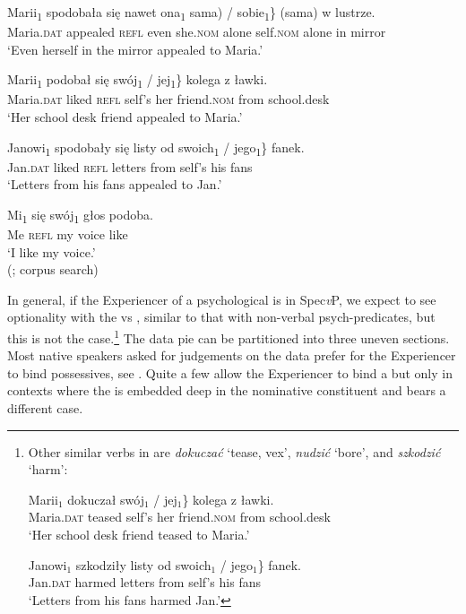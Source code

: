 \documentclass[output=paper,nonflat,colorlinks,citecolor=brown,newtxmath]{langsci/langscibook}
\begin{document}
\ea \label{ex:witkos:43}
\gll Marii\textsubscript{1} spodobała się nawet  ona\textsubscript{1} \minsp{\{(} sama) / \minsp{*} sobie\textsubscript{1}\} (sama) w lustrze.\\
     Maria.\textsc{dat} appealed \textsc{refl} even {} she.\textsc{nom} {} alone {} {} self.\textsc{nom} alone in mirror\\
\glt `Even herself in the mirror appealed to Maria.'
\z

\ea \label{ex:witkos:44}
\gll Marii\textsubscript{1} podobał się \minsp{\{*} swój\textsubscript{1} / jej\textsubscript{1}\} kolega z ławki.\\
     Maria.\textsc{dat} liked \textsc{refl} {} self’s {} her friend.\textsc{nom} from school.desk\\
\glt `Her school desk friend appealed to Maria.'
\z

\ea \label{ex:witkos:45}
\gll Janowi\textsubscript{1} spodobały się listy od \minsp{\{} swoich\textsubscript{1} / jego\textsubscript{1}\} fanek.\\
     Jan.\textsc{dat} liked \textsc{refl} letters from {} self’s {} his fans\\
\glt `Letters from his fans appealed to Jan.'
\z

\ea \label{ex:witkos:46}
\gll Mi\textsubscript{1} się swój\textsubscript{1} głos podoba.\\
     Me \textsc{refl} my voice like\\
\glt `I like my voice.' \\
\xspace\hfill(\citealt[107, ex. (62)]{miechowicz2008}; corpus search)
\z

\noindent In general, if the  Experiencer of a psychological  is in Spec\textit{v}P, we expect to see optionality with the  vs , similar to that with non-verbal psych-predicates, but this is not the case.\footnote{\label{fn24}Other similar verbs in  are \textit{dokuczać} ‘tease, vex’, \textit{nudzić} ‘bore’, and \textit{szkodzić} ‘harm’:

\ea
\gll Marii$_1$ dokuczał \minsp{\{*} swój$_1$ / jej$_1$\} kolega z ławki.\\
Maria.\textsc{dat} teased {} self’s  {} her friend.\textsc{nom} from school.desk\\
\glt `Her school desk friend teased to Maria.’
\z

\ea
\gll Janowi$_1$ szkodziły listy od  swoich$_1$ / jego$_1$\} fanek.\\
Jan.\textsc{dat} harmed letters from {} self’s {} his fans\\
\glt `Letters from his fans harmed Jan.’
\z} The data pie can be partitioned into three uneven sections. Most native speakers asked for judgements on the data prefer for the  Experiencer to bind  possessives, see . Quite a few allow the  Experiencer to bind a   but only in contexts where the  is embedded deep in the nominative constituent and bears a different case.
\end{document}

